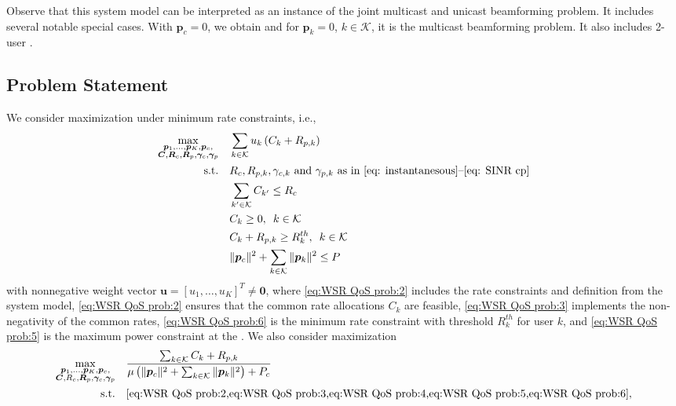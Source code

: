 \documentclass[a4paper,10pt,journal]{IEEEtran}
\let\vec\bm
\begin{document}
Observe that this system model can be interpreted as an instance of the joint multicast and unicast beamforming problem. It includes several notable special cases. With $\vec p_c = 0$, we obtain  and for $\vec p_k = 0$, $k \in \mathcal K$, it is the multicast beamforming problem. It also includes 2-user  \cite{bruno2019wcl}.

\subsection{Problem Statement} \label{sec:transf}
We consider  maximization under minimum rate  constraints, i.e.,
\begin{subequations}
	\label{eq:WSR QoS prob}
	\begin{align}
		\max_{\substack{\vec p_1, \dots, \vec p_K, \vec p_c,\\ \vec C, \vec R_c, \vec R_p, \vec \gamma_c, \vec \gamma_p}}\quad
		& \sum_{k\in\mathcal{K}} u_k \left(C_k+R_{p,k}\right)\\
	\mbox{s.t.}\quad
& R_{c}, R_{p,k}, \gamma_{c,k} \text{ and } \gamma_{p,k} \text{ as in \eqref{eq: instantanesous}--\eqref{eq: SINR cp}}\label{eq:WSR QoS prob:2} \\
	& \sum_{k'\in \mathcal{K}}C_{k'}\leq R_{c} \label{eq:WSR QoS prob:3} \\
	& C_k\geq 0,\enskip k\in\mathcal{K} \label{eq:WSR QoS prob:4} \\
	& C_k+R_{p,k}\geq R_k^{th},\enskip k\in\mathcal{K} \label{eq:WSR QoS prob:6} \\
	& \Vert \vec p_c \Vert^2 + \sum_{k\in\mathcal K} \Vert \vec p_k \Vert^2 \le P \label{eq:WSR QoS prob:5}
	\end{align}
\end{subequations}
with nonnegative weight vector $\vec{u}=[u_1,\ldots,u_K]^T \neq \vec 0$, where \cref{eq:WSR QoS prob:2} includes the rate constraints and  definition from the system model, \cref{eq:WSR QoS prob:2} ensures that the common rate allocations $C_k$ are feasible, \cref{eq:WSR QoS prob:3} implements the non-negativity of the common rates, \cref{eq:WSR QoS prob:6} is the minimum rate constraint with threshold $R_k^{th}$ for user $k$, and \cref{eq:WSR QoS prob:5} is the maximum power constraint at the .
We also consider
 maximization
\begin{subequations}
	\label{eq:EE prob}
	\begin{align}
		\max_{\substack{\vec p_1, \dots, \vec p_K, \vec p_c,\\ \vec C, R_c, \vec R_p, \vec \gamma_c, \vec \gamma_p}}\quad
		& \frac{\sum_{k\in\mathcal{K}} C_k+R_{p,k}}{\mu \left( \Vert \vec p_c \Vert^2 + \sum_{k\in\mathcal K} \Vert \vec p_k \Vert^2 \right) + P_c} \\
	\mbox{s.t.}\quad
	& \text{\cref{eq:WSR QoS prob:2,eq:WSR QoS prob:3,eq:WSR QoS prob:4,eq:WSR QoS prob:5,eq:WSR QoS prob:6}},
	\end{align}
\end{subequations}
\end{document}
